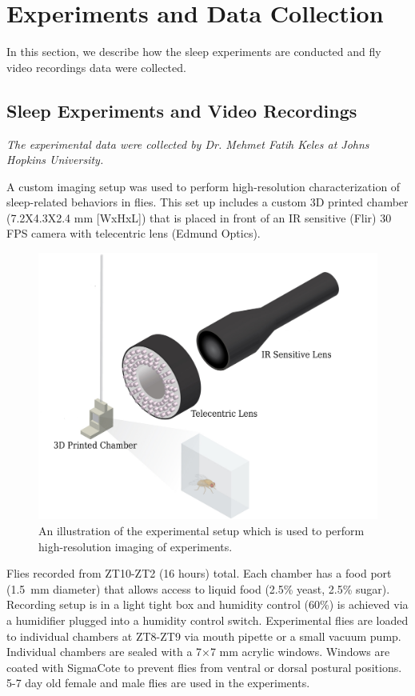 \chapter{Experiments and Data Collection}\label{chapter:expt-data-collection}
In this section, we describe how the sleep experiments are conducted and fly video recordings data were collected.

\section{Sleep Experiments and Video Recordings}

\textit{The experimental data were collected by Dr. Mehmet Fatih Keles at Johns Hopkins University.}

A custom imaging setup was used to perform high-resolution characterization of sleep-related behaviors in flies. This set up includes a custom 3D printed chamber (7.2X4.3X2.4 mm [WxHxL]) that is placed in front of an IR sensitive (Flir) 30 FPS camera with telecentric lens (Edmund Optics).

\begin{figure}[b!]
	\centering
	\includegraphics[width=0.75\linewidth]{figures/ExperimentalSetup.pdf}
	\caption[An illustration of the experimental setup which is used to perform high-resolution imaging of experiments.]{An illustration of the experimental setup which is used to perform high-resolution imaging of experiments.}
\end{figure}

Flies recorded from ZT10-ZT2 (16 hours) total.
Each chamber has a food port (1.5 mm diameter) that allows access to liquid food (2.5\% yeast, 2.5\% sugar).
Recording setup is in a light tight box and humidity control (60\%) is achieved via a humidifier plugged into a humidity control switch. Experimental flies are loaded to individual chambers at ZT8-ZT9 via mouth pipette or a small vacuum pump.
Individual chambers are sealed with a 7×7 mm acrylic windows.
Windows are coated with SigmaCote to prevent flies from ventral or dorsal postural positions. 5-7 day old female and male flies are used in the experiments.

